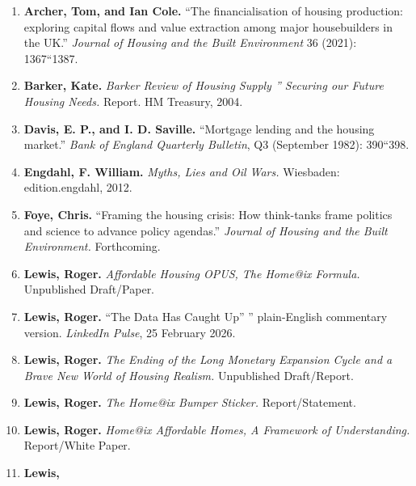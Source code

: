 \documentclass[
]{article}
\providecommand{\tightlist}{%
  \setlength{\itemsep}{0pt}\setlength{\parskip}{0pt}}
\begin{document}
\begin{enumerate}
\def\labelenumi{\arabic{enumi}.}
\tightlist
\item
  \protect{}\label{ref-archer2021}{\textbf{Archer, Tom, and
  Ian Cole.} ``The financialisation of housing production: exploring
  capital flows and value extraction among major housebuilders in the
  UK.'' \emph{Journal of Housing and the Built Environment} 36 (2021):
  1367``1387.}
\item
  \protect{}\label{ref-barker2004}{\textbf{Barker, Kate.}
  \emph{Barker Review of Housing Supply '' Securing our Future Housing
  Needs.} Report. HM Treasury, 2004.}
\item
  \protect{}\label{ref-davis1982}{\textbf{Davis, E. P., and
  I. D. Saville.} ``Mortgage lending and the housing market.''
  \emph{Bank of England Quarterly Bulletin}, Q3 (September 1982):
  390``398.}
\item
  \protect{}\label{ref-engdahl2012}{\textbf{Engdahl, F.
  William.} \emph{Myths, Lies and Oil Wars.} Wiesbaden: edition.engdahl,
  2012.}
\item
  \protect{}\label{ref-foye-forthcoming}{\textbf{Foye,
  Chris.} ``Framing the housing crisis: How think-tanks frame politics
  and science to advance policy agendas.'' \emph{Journal of Housing and
  the Built Environment.} Forthcoming.}
\item
  \protect{}\label{ref-lewis-opus}{\textbf{Lewis, Roger.}
  \emph{Affordable Housing OPUS, The Home@ix Formula.} Unpublished
  Draft/Paper.}
\item
  \protect{}\label{ref-lewis-linkedin-data}{\textbf{Lewis,
  Roger.} ``The Data Has Caught Up'' '' plain-English commentary
  version. \emph{LinkedIn Pulse}, 25 February 2026.}
\item
  \protect{}\label{ref-lewis-monetary}{\textbf{Lewis,
  Roger.} \emph{The Ending of the Long Monetary Expansion Cycle and a
  Brave New World of Housing Realism.} Unpublished Draft/Report.}
\item
  \protect{}\label{ref-lewis-bumper}{\textbf{Lewis, Roger.}
  \emph{The Home@ix Bumper Sticker.} Report/Statement.}
\item
  \protect{}\label{ref-lewis-framework}{\textbf{Lewis,
  Roger.} \emph{Home@ix Affordable Homes, A Framework of Understanding.}
  Report/White Paper.}
\item
  \protect{}\label{ref-lewis-linkedin-credit}{\textbf{Lewis,
}}
\end{enumerate}
\end{document}
